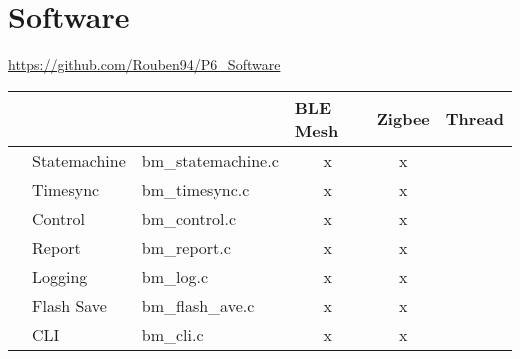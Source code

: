 \clearpage
\section{Software}\label{sec:Software}
\url{https://github.com/Rouben94/P6_Software}


\newcommand{\rotcells}[1]{%
  \rotatebox[origin=c]{90}{ #1 }%
}

\begin{table}[h]
\centering
\begin{tabular}{|c|l|l|c|c|c|} 
\hline
\multicolumn{1}{|l|}{}                                                                    & \multicolumn{2}{l|}{}                                & \multicolumn{1}{l|}{BLE Mesh} & Zigbee & Thread  \\ 
\hline
\multirow{8}{*}{\rotcells{SharedLib}}                                                      & Statemachine    & bm\_statemachine.c                 & x                             & x      &         \\ 
\cline{2-6}
                                                                                          & Timesync        & bm\_timesync.c                     & x                             & x      &         \\ 
\cline{2-6}
                                                                                          & Control         & bm\_control.c                      & x                             & x      &         \\ 
\cline{2-6}
                                                                                          & Report          & bm\_report.c                       & x                             & x      &         \\ 
\cline{2-6}
                                                                                          & Logging         & bm\_log.c                          & x                             & x      &         \\ 
\cline{2-6}
                                                                                          & Flash Save      & bm\_flash\_ave.c                   & x                             & x      &         \\ 
\cline{2-6}
                                                                                          & CLI             & bm\_cli.c                          & x                             & x      &         \\ 

\end{tabular}
\end{table}
